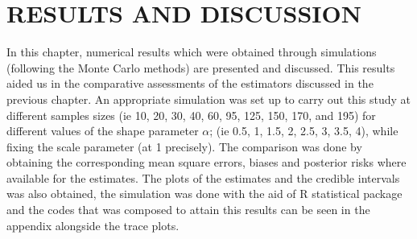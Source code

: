\documentclass[a4paper,12pt]{report}
\newcommand{\para}{\hspace{0.5cm}}
\begin{document}
\newpage
\chapter{RESULTS AND DISCUSSION}
\para In this chapter, numerical results which were obtained through simulations (following the Monte Carlo methods) are presented and discussed. This results aided us in the comparative assessments of the estimators discussed in the previous chapter. An appropriate simulation was set up to carry out this study at different samples sizes (ie 10, 20, 30, 40, 60, 95, 125, 150, 170, and 195) for different values of the shape parameter $\alpha$; (ie 0.5, 1, 1.5, 2, 2.5, 3, 3.5, 4), while fixing the scale parameter (at 1 precisely). The comparison was done by obtaining the corresponding mean square errors, biases and posterior risks where available for the estimates. The plots of the estimates and the credible intervals was also obtained, the simulation was done with the aid of R statistical package and the codes that was composed to attain this results can be seen in the appendix alongside the trace plots.\\

\singlespacing
{}\\
\begin{minipage}{\linewidth}
	\noindent	{}
\end{minipage}



\newpage
{}

{}\\
\end{document}
